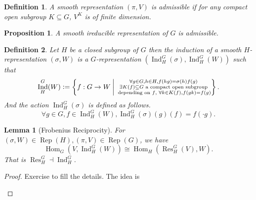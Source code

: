 \documentclass[10pt]{article}
\newtheorem{proposition}{Proposition}[section]
\newtheorem{definition}{Definition}[section]
\newtheorem{lemma}{Lemma}[section]
\numberwithin{equation}{theorem}
\DeclareMathOperator{\Ind}{Ind}
\DeclareMathOperator{\Rep}{Rep}
\DeclareMathOperator{\Hom}{Hom}
\DeclareMathOperator{\Res}{Res}
\newcommand{\defeq}{\vcentcolon=}
\begin{document}
\begin{definition}
    \label{definition_3_4}
    A smooth representation $(\pi,V)$ is admissible if for any compact open subgroup $K\subseteq G$, $V^K$ is of finite dimension.
\end{definition}

\begin{proposition}
    \label{proposition_3_1}
    A smooth ireducible representation of $G$ is admissible.
\end{proposition}

\begin{definition}
    \label{definition_3_5}
    Let $H$ be a closed subgroup of $G$ then the induction of a smooth $H$-representation $(\sigma,W)$ is a $G$-representation $(\Ind_H^G(\sigma),\Ind_H^G(W))$ such that 
    \begin{equation*}
        \Ind_H^G(W) \defeq\left\{f:G\to W\:\bigg{\vert}\: \substack{\forall g\in G, h\in H, f(hg) = \sigma(h)f(g)\\ \exists K(f)\subseteq G \text{ a compact open subgroup}\\\text{ depending on $f$, } \forall k\in K(f), f(gk) = f(g)}\right\}.
    \end{equation*}
    And the action $\Ind_H^G(\sigma)$ is defined as follows.
    \begin{equation*}
        \forall g\in G,f\in\Ind_H^G(W), \Ind_H^G(\sigma)(g)(f) = f(\cdot g).
    \end{equation*}
\end{definition}

\begin{lemma}[Frobenius Reciprocity]
    \label{lemma_3_2}
    For $(\sigma,W)\in\Rep(H),(\pi,V)\in\Rep(G)$, we have 
    \begin{equation*}
        \Hom_G(V,\Ind_H^G(W))\cong \Hom_H(\Res_H^G(V),W).
    \end{equation*}
    That is $\Res_H^G\dashv \Ind_H^G$.
\end{lemma}

\begin{proof}Exercise to fill the details. The idea is 
    \begin{center}
    \end{center}
\end{proof}
\end{document}
